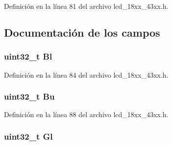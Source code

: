 Definición en la línea 81 del archivo lcd\+\_\+18xx\+\_\+43xx.\+h.



\subsection{Documentación de los campos}
\subsubsection[{\texorpdfstring{Bl}{Bl}}]{\setlength{\rightskip}{0pt plus 5cm}uint32\+\_\+t Bl}\hypertarget{struct_l_c_d___p_a_l_e_t_t_e___e_n_t_r_y___t_a02ab190a2cbb91b6f1b4d157bbacf3a9}{}\label{struct_l_c_d___p_a_l_e_t_t_e___e_n_t_r_y___t_a02ab190a2cbb91b6f1b4d157bbacf3a9}


Definición en la línea 84 del archivo lcd\+\_\+18xx\+\_\+43xx.\+h.

\subsubsection[{\texorpdfstring{Bu}{Bu}}]{\setlength{\rightskip}{0pt plus 5cm}uint32\+\_\+t Bu}\hypertarget{struct_l_c_d___p_a_l_e_t_t_e___e_n_t_r_y___t_ae4d6ee4f473f96371659cac879e0ebec}{}\label{struct_l_c_d___p_a_l_e_t_t_e___e_n_t_r_y___t_ae4d6ee4f473f96371659cac879e0ebec}


Definición en la línea 88 del archivo lcd\+\_\+18xx\+\_\+43xx.\+h.

\subsubsection[{\texorpdfstring{Gl}{Gl}}]{\setlength{\rightskip}{0pt plus 5cm}uint32\+\_\+t Gl}\hypertarget{struct_l_c_d___p_a_l_e_t_t_e___e_n_t_r_y___t_ac2ef5652c3036f4e2e6726827358ce36}{}\label{struct_l_c_d___p_a_l_e_t_t_e___e_n_t_r_y___t_ac2ef5652c3036f4e2e6726827358ce36}


